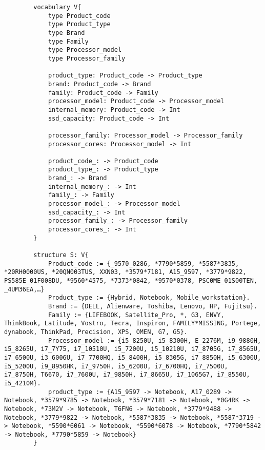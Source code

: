 \begin{listing}
\begin{verbatim}
        vocabulary V{
            type Product_code
            type Product_type
            type Brand
            type Family
            type Processor_model
            type Processor_family
            
            product_type: Product_code -> Product_type
            brand: Product_code -> Brand
            family: Product_code -> Family
            processor_model: Product_code -> Processor_model
            internal_memory: Product_code -> Int
            ssd_capacity: Product_code -> Int
            
            processor_family: Processor_model -> Processor_family
            processor_cores: Processor_model -> Int
            
            product_code_: -> Product_code
            product_type_: -> Product_type
            brand_: -> Brand
            internal_memory_: -> Int
            family_: -> Family
            processor_model_: -> Processor_model
            ssd_capacity_: -> Int
            processor_family_: -> Processor_family
            processor_cores_: -> Int
        }
        
        structure S: V{
            Product_code := {_9570_0286, *7790*5859, *5587*3835, *20RH0000US, *20QN003TUS, XXN03, *3579*7181, A15_9597, *3779*9822, PS585E_01F008DU, *9560*4575, *7373*0842, *9570*0378, PSC0ME_01S00TEN, _4UM36EA,…}
            Product_type := {Hybrid, Notebook, Mobile_workstation}.
            Brand := {DELL, Alienware, Toshiba, Lenovo, HP, Fujitsu}.
            Family := {LIFEBOOK, Satellite_Pro, *, G3, ENVY, ThinkBook, Latitude, Vostro, Tecra, Inspiron, FAMILY*MISSING, Portege, dynabook, ThinkPad, Precision, XPS, OMEN, G7, G5}.
            Processor_model := {i5_8250U, i5_8300H, E_2276M, i9_9880H, i5_8265U, i7_7Y75, i7_10510U, i5_7200U, i5_10210U, i7_8705G, i7_8565U, i7_6500U, i3_6006U, i7_7700HQ, i5_8400H, i5_8305G, i7_8850H, i5_6300U, i5_5200U, i9_8950HK, i7_9750H, i5_6200U, i7_6700HQ, i7_7500U, i7_8750H, T6670, i7_7600U, i7_9850H, i7_8665U, i7_1065G7, i7_8550U, i5_4210M}.
            product_type := {A15_9597 -> Notebook, A17_0289 -> Notebook, *3579*9785 -> Notebook, *3579*7181 -> Notebook, *0G4RK -> Notebook, *73M2V -> Notebook, T6FN6 -> Notebook, *3779*9488 -> Notebook, *3779*9822 -> Notebook, *5587*3835 -> Notebook, *5587*3719 -> Notebook, *5590*6061 -> Notebook, *5590*6078 -> Notebook, *7790*5842 -> Notebook, *7790*5859 -> Notebook}
        }
        

\end{verbatim}
\end{listing}
